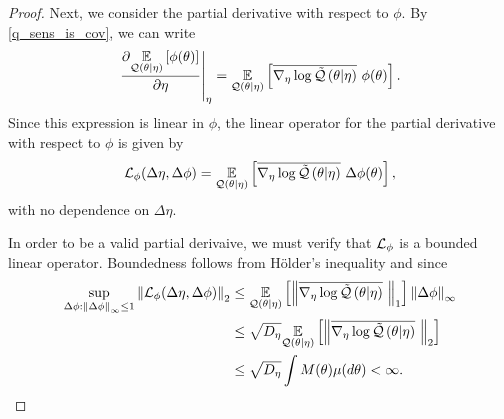 \begin{lem}
\begin{proof}
Next, we consider the partial derivative with respect to $\phi$.  By \eqref{q_sens_is_cov}, we can write
%
\begin{align*}
%
\fracat{\partial \expect{\q(\theta \vert \eta)}{\phi(\theta)}}
       {\partial \eta}{\eta}
={}
\expect{\q(\theta \vert \eta)}
       {\lqgradbar{\theta \vert \eta} \phi(\theta)}.
%
\end{align*}
%
Since this expression is linear in $\phi$, the linear operator for the partial
derivative with respect to $\phi$ is given by
%
\begin{align*}
%
\linop_\phi(\Delta \eta, \Delta \phi) =
    \expect{\q(\theta \vert \eta)}
           {\lqgradbar{\theta \vert \eta} \Delta \phi(\theta)},
%
\end{align*}
%
with no dependence on $\Delta \eta$.

In order to be a valid partial derivaive, we must verify that $\mathcal{L}_\phi$ is a
bounded linear operator.  Boundedness follows from H{\"o}lder's inequality and
 since
%
\begin{align*}
%
\sup_{\Delta\phi: \norminf{\Delta\phi} \le 1}
    \norm{\linop_\phi(\Delta \eta, \Delta \phi)}_2
\le{}&
\expect{\q(\theta \vert \eta)}
       {\norm{\lqgradbar{\theta \vert \eta}}_1} \norminf{\Delta \phi}
\\\le{}&
\sqrt{\etadim}\expect{\q(\theta \vert \eta)}
       {\norm{\lqgradbar{\theta \vert \eta}}_2}
\\\le{}&
\sqrt{\etadim} \int M(\theta) \mu(d\theta) < \infty.
%
\end{align*}


\end{proof}
\end{lem}
